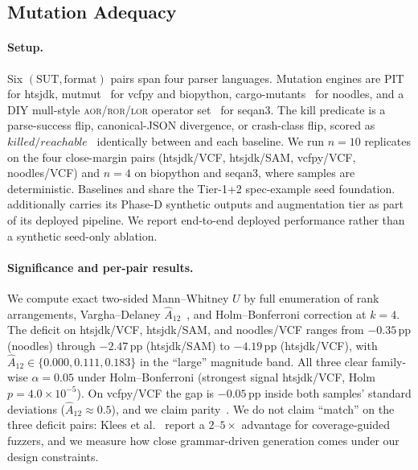 
\subsection{Mutation Adequacy}
\label{sec:mutation-adequacy}

\paragraph{Setup.}
Six $(\mathrm{SUT, format})$ pairs span four parser languages.
Mutation engines are PIT~\citep{coles2016pit} for htsjdk,
mutmut~\citep{mutmut2024} for vcfpy and biopython,
cargo-mutants~\citep{cargomutants2024} for noodles, and a DIY
mull-style \textsc{aor}/\textsc{ror}/\textsc{lor} operator
set~\citep{denisov2018mull,just2014mutants} for seqan3. The kill
predicate is a parse-success flip, canonical-JSON divergence,
or crash-class flip, scored as
$\mathit{killed}/\mathit{reachable}$~\citep{coles2016pit,papadakis2019mutation}
identically between \biotest{} and each baseline. We run
$n{=}10$ replicates on the four close-margin pairs (htsjdk/VCF,
htsjdk/SAM, vcfpy/VCF, noodles/VCF) and $n{=}4$ on biopython and
seqan3, where samples are deterministic. Baselines and \biotest{} share the Tier-1+2 spec-example seed
foundation. \biotest{} additionally carries its Phase-D
synthetic outputs and augmentation tier as part of its deployed
pipeline. We report end-to-end deployed performance rather than
a synthetic seed-only ablation.



\paragraph{Significance and per-pair results.}
We compute exact two-sided Mann--Whitney $U$ by full enumeration
of rank arrangements, Vargha--Delaney
$\hat{A}_{12}$~\citep{vargha2000critique}, and Holm--Bonferroni
correction at $k{=}4$. The deficit on htsjdk/VCF, htsjdk/SAM, and
noodles/VCF ranges from $-0.35$\,pp (noodles) through
$-2.47$\,pp (htsjdk/SAM) to $-4.19$\,pp (htsjdk/VCF), with
$\hat{A}_{12} \in \{0.000, 0.111, 0.183\}$ in the ``large''
magnitude band. All three clear family-wise $\alpha{=}0.05$ under
Holm--Bonferroni (strongest signal htsjdk/VCF, Holm
$p{=}4.0\times 10^{-5}$). On vcfpy/VCF the gap is $-0.05$\,pp inside both samples'
standard deviations ($\hat{A}_{12}{\approx}0.5$), and we claim
parity~\citep{arcuri2014statistical}. We do not claim ``match''
on the three deficit pairs: Klees et al.~\cite{klees2018fuzz}
report a $2$--$5{\times}$ advantage for coverage-guided fuzzers,
and we measure how close grammar-driven generation comes under
our design constraints.


